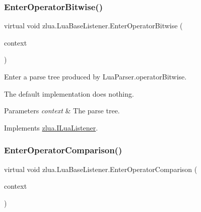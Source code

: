 \subsubsection{\texorpdfstring{Enter\+Operator\+Bitwise()}{EnterOperatorBitwise()}}
{\footnotesize\ttfamily virtual void zlua.\+Lua\+Base\+Listener.\+Enter\+Operator\+Bitwise (\begin{DoxyParamCaption}\item[{\mbox{[}\+Not\+Null\mbox{]} \mbox{\hyperlink{classzlua_1_1_lua_parser_1_1_operator_bitwise_context}{Lua\+Parser.\+Operator\+Bitwise\+Context}}}]{context }\end{DoxyParamCaption})\hspace{0.3cm}{\ttfamily [virtual]}}



Enter a parse tree produced by Lua\+Parser.\+operator\+Bitwise. 

The default implementation does nothing.


\begin{DoxyParams}{Parameters}
{\em context} & The parse tree.\\
\hline
\end{DoxyParams}


Implements \mbox{\hyperlink{interfacezlua_1_1_i_lua_listener_a0117059ce449d21ba61dc80748edaa15}{zlua.\+I\+Lua\+Listener}}.

\mbox{\label{classzlua_1_1_lua_base_listener_a27a11e4053e2a7c40f464e0a893bbf70}} 
\subsubsection{\texorpdfstring{Enter\+Operator\+Comparison()}{EnterOperatorComparison()}}
{\footnotesize\ttfamily virtual void zlua.\+Lua\+Base\+Listener.\+Enter\+Operator\+Comparison (\begin{DoxyParamCaption}\item[{\mbox{[}\+Not\+Null\mbox{]} \mbox{\hyperlink{classzlua_1_1_lua_parser_1_1_operator_comparison_context}{Lua\+Parser.\+Operator\+Comparison\+Context}}}]{context }\end{DoxyParamCaption})\hspace{0.3cm}{\ttfamily [virtual]}}




